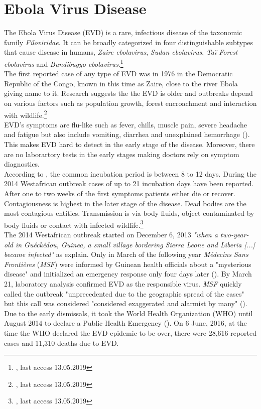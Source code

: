\documentclass{article}
\begin{document}
\section{Ebola Virus Disease}
The Ebola Virus Disease (EVD) is a rare, infectious disease of the taxonomic family \textit{Filoviridae}. It can be broadly categorized in four distinguishable subtypes that cause disease in humans, \textit{Zaire ebolavirus}, \textit{Sudan ebolavirus}, \textit{Ta\"{i} Forest ebolavirus} and \textit{Bundibugyo ebolavirus}.\footnote{\cite{cdc_1}, last access 13.05.2019} \\
The first reported case of any type of EVD was in 1976 in the Democratic Republic of the Congo, known in this time as Zaire, close to the river Ebola giving name to it. Research suggests the the EVD is older and outbreaks depend on various factors such as population growth, forest encroachment and interaction with wildlife.\footnote{\cite{cdc_2}, last access 13.05.2019} \\
EVD's symptoms are flu-like such as fever, chills, muscle pain, severe headache and fatigue but also include vomiting, diarrhea and unexplained hemorrhage (\cite{goeijenbier2014ebola}). This makes EVD hard to detect in the early stage of the disease. Moreover, there are no laborartory tests in the early stages making doctors rely on symptom diagnostics. \\
According to \cite{van2015review}, the common incubation period is between 8 to 12 days. During the 2014 Westafrican outbreak cases of up to 21 incubation days have been reported. After one to two weeks of the first symptoms patients either die or recover. Contagiousness is highest in the later stage of the disease. Dead bodies are the most contagious entities. Transmission is via body fluids, object contaminated by body fluids or contact with infected wildlife.\footnote{\cite{cdc_3}, last access 13.05.2019} \\
The 2014 Westafrican outbreak started on December 6, 2013 \textit{"when a two-year-old in Gu\'{e}ck\'{e}dou, Guinea, a small village bordering Sierra Leone and Liberia [...] became infected"} as \cite{alexander2015factors} explain. Only in March of the following year 
\textit{M\'{e}decins Sans Fronti\`{e}res} (\textit{MSF}) were informed by Guinean health officials about a "mysterious disease" and initialized an emergency response only four days later (\cite{frontieres2015pushed}). By March 21, laboratory analysis confirmed EVD as the responsible virus. \textit{MSF} quickly called the outbreak "unprecedented due to the geographic spread of the cases" but this call was considered "considered exaggerated and alarmist by many" (\cite{frontieres2015pushed}). Due to the early dismissals, it took the World Health Organization (WHO) until August 2014 to declare a Public Health Emergency (\cite{ravi2019review}). On 6 June, 2016, at the time the WHO declared the EVD epidemic to be over, there were 28,616 reported cases and 11,310 deaths due to EVD.\\
\end{document}
